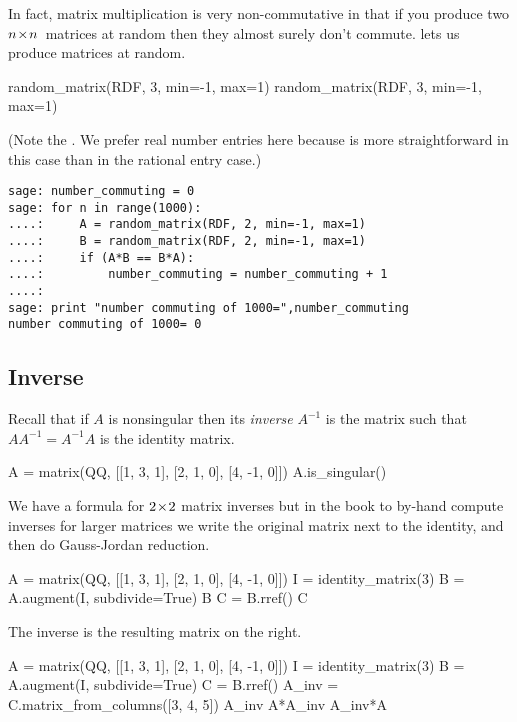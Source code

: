 In fact, matrix multiplication is very non-commutative 
in that if you produce two $n \! \times \! n$~matrices
at random then they almost surely don't commute.
\Sage{} lets us produce matrices at random.
\begin{sageoutput}
random_matrix(RDF, 3, min=-1, max=1)
random_matrix(RDF, 3, min=-1, max=1)
\end{sageoutput}
\noindent  
(Note the .
We prefer real number entries here because
is more straightforward in this case than in the  
rational entry case.)

\begin{lstlisting}
sage: number_commuting = 0 
sage: for n in range(1000):                                       
....:     A = random_matrix(RDF, 2, min=-1, max=1)
....:     B = random_matrix(RDF, 2, min=-1, max=1)
....:     if (A*B == B*A):
....:         number_commuting = number_commuting + 1 
....: 
sage: print "number commuting of 1000=",number_commuting
number commuting of 1000= 0  
\end{lstlisting}

 


\subsection{Inverse}
Recall that if $A$ is nonsingular then its \textit{inverse} $A^{-1}$
is the matrix such that $AA^{-1}=A^{-1}A$ is the identity matrix. 
\begin{sageoutput}
A = matrix(QQ, [[1, 3, 1], [2, 1, 0], [4, -1, 0]])
A.is_singular()
\end{sageoutput}
\noindent
We have a formula for $2 \! \times \! 2$ matrix inverses
but in the book to by-hand compute inverses for larger matrices 
we write the original matrix next to the identity, 
and then do Gauss-Jordan reduction.
\begin{sageoutput}[d,0,1]
A = matrix(QQ, [[1, 3, 1], [2, 1, 0], [4, -1, 0]])
I = identity_matrix(3)
B = A.augment(I, subdivide=True)
B
C = B.rref()
C
\end{sageoutput}
\noindent
The inverse is the resulting matrix on the right.
\begin{sageoutput}[d,0,4]
A = matrix(QQ, [[1, 3, 1], [2, 1, 0], [4, -1, 0]])
I = identity_matrix(3)
B = A.augment(I, subdivide=True)
C = B.rref()
A_inv = C.matrix_from_columns([3, 4, 5])
A_inv
A*A_inv
A_inv*A
\end{sageoutput}

